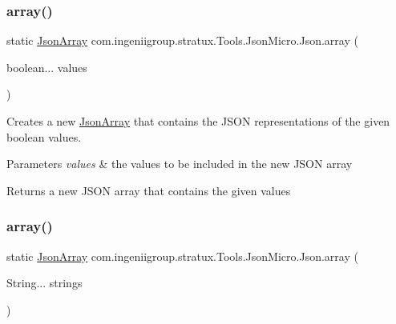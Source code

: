 \subsubsection{\texorpdfstring{array()}{array()}\hspace{0.1cm}{\footnotesize\ttfamily [6/7]}}
{\footnotesize\ttfamily static \hyperlink{classcom_1_1ingeniigroup_1_1stratux_1_1_tools_1_1_json_micro_1_1_json_array}{Json\+Array} com.\+ingeniigroup.\+stratux.\+Tools.\+Json\+Micro.\+Json.\+array (\begin{DoxyParamCaption}\item[{boolean...}]{values }\end{DoxyParamCaption})\hspace{0.3cm}{\ttfamily [static]}}

Creates a new \hyperlink{classcom_1_1ingeniigroup_1_1stratux_1_1_tools_1_1_json_micro_1_1_json_array}{Json\+Array} that contains the J\+S\+ON representations of the given {\ttfamily boolean} values.


\begin{DoxyParams}{Parameters}
{\em values} & the values to be included in the new J\+S\+ON array \\
\hline
\end{DoxyParams}
\begin{DoxyReturn}{Returns}
a new J\+S\+ON array that contains the given values 
\end{DoxyReturn}
\mbox{\label{classcom_1_1ingeniigroup_1_1stratux_1_1_tools_1_1_json_micro_1_1_json_a5f2a3969d538912ccaa07c68b5d1801c}} 
\subsubsection{\texorpdfstring{array()}{array()}\hspace{0.1cm}{\footnotesize\ttfamily [7/7]}}
{\footnotesize\ttfamily static \hyperlink{classcom_1_1ingeniigroup_1_1stratux_1_1_tools_1_1_json_micro_1_1_json_array}{Json\+Array} com.\+ingeniigroup.\+stratux.\+Tools.\+Json\+Micro.\+Json.\+array (\begin{DoxyParamCaption}\item[{String...}]{strings }\end{DoxyParamCaption})\hspace{0.3cm}{\ttfamily [static]}}

